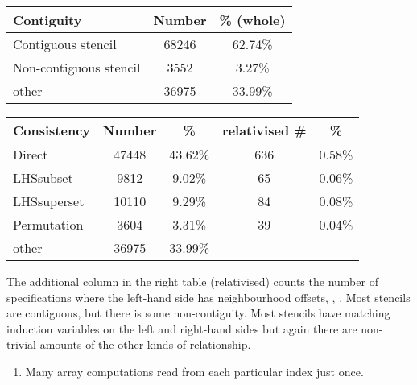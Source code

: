 \begin{center}
\begin{minipage}{0.42\linewidth}
\hspace{-1.6em}
\begin{tabular}{l|S[table-format=4]S[table-format=2.2]}
\textbf{Contiguity} & \textbf{Number} & \% {(whole)} \\\hline
Contiguous stencil         & 68246     & 62.74\%  \\\hline
Non-contiguous stencil     & 3552      & 3.27\%  \\\hline
other                      & 36975     & 33.99\% \\\hline
\end{tabular}
\vspace{2.4em}
\end{minipage}
\begin{minipage}{0.5\linewidth}
\begin{tabular}{l|S[table-format=4]S[table-format=2.2]S[table-format=4]S[table-format=2.2]}
\textbf{Consistency} & \textbf{Number} & \% & \textbf{relativised \#} & \% \\\hline
Direct                            & 47448     & 43.62\% & 636       & 0.58\%  \\\hline
LHSsubset                         & 9812      & 9.02\% & 65        & 0.06\%  \\\hline
LHSsuperset                       & 10110     & 9.29\%  & 84        & 0.08\%  \\\hline
Permutation                       & 3604      & 3.31\%  & 39        & 0.04\%  \\\hline
other                             & 36975     & 33.99\% \\\hline
\end{tabular}
\end{minipage}
\end{center}
The additional column in the right table (relativised) counts the
number of specifications where the left-hand side has neighbourhood
offsets, \eg{}, .
Most stencils are contiguous, but there is some
non-contiguity. Most stencils have matching induction
variables on the left and right-hand sides but again there
are non-trivial amounts of the other kinds of relationship.
\begin{enumerate}[resume]
\item Many array computations read from each particular index just
  once.
\end{enumerate}
